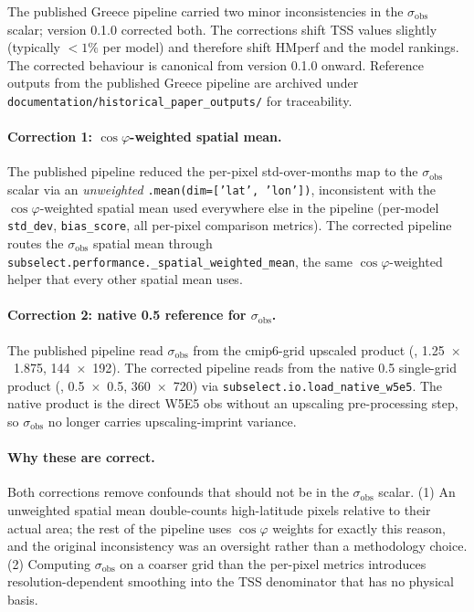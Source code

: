 \documentclass[11pt,a4paper]{article}
\begin{document}
The published Greece pipeline carried two minor inconsistencies in the
$\sigma_{\text{obs}}$ scalar; version 0.1.0 corrected both. The
corrections shift TSS values slightly (typically $<\!1\%$ per model)
and therefore shift HMperf and the model rankings. The corrected
behaviour is canonical from version 0.1.0 onward. Reference outputs
from the published Greece pipeline are archived under
\texttt{documentation/historical\_paper\_outputs/} for traceability.

\paragraph{Correction 1: $\cos\varphi$-weighted spatial mean.}
The published pipeline reduced the per-pixel std-over-months map to
the $\sigma_{\text{obs}}$ scalar via an \emph{unweighted}
\texttt{.mean(dim=['lat', 'lon'])}, inconsistent with the
$\cos\varphi$-weighted spatial mean used everywhere else in the
pipeline (per-model \texttt{std\_dev}, \texttt{bias\_score}, all
per-pixel comparison metrics). The corrected pipeline routes the
$\sigma_{\text{obs}}$ spatial mean through
\texttt{subselect.performance.\_spatial\_weighted\_mean}, the same
$\cos\varphi$-weighted helper that every other spatial mean uses.

\paragraph{Correction 2: native 0.5\textdegree{} reference for $\sigma_{\text{obs}}$.}
The published pipeline read $\sigma_{\text{obs}}$ from the cmip6-grid
upscaled product
(,
1.25\textdegree~$\times$~1.875\textdegree, 144~$\times$~192). The
corrected pipeline reads from the native 0.5\textdegree{} single-grid
product (,
0.5\textdegree~$\times$~0.5\textdegree, 360~$\times$~720) via
\texttt{subselect.io.load\_native\_w5e5}. The native product is the
direct W5E5 obs without an upscaling pre-processing step, so
$\sigma_{\text{obs}}$ no longer carries upscaling-imprint variance.

\paragraph{Why these are correct.}
Both corrections remove confounds that should not be in the
$\sigma_{\text{obs}}$ scalar. (1) An unweighted spatial mean
double-counts high-latitude pixels relative to their actual area; the
rest of the pipeline uses $\cos\varphi$ weights for exactly this reason,
and the original inconsistency was an oversight rather than a
methodology choice. (2) Computing $\sigma_{\text{obs}}$ on a coarser
grid than the per-pixel metrics introduces resolution-dependent
smoothing into the TSS denominator that has no physical basis.
\end{document}

